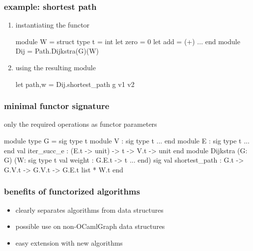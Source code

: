 \documentclass{beamer}
\newcommand{\ocamlgraph}{\textsf{OCamlGraph}}
\let\emph\alert
\begin{document}
\begin{frame}[fragile]
  \frametitle{example: shortest path}

  \begin{enumerate}
  \item \emph{instantiating} the functor
  \begin{ocaml}
    module W = struct
      type t = int
      let zero = 0
      let add = (+)
      ...
    end
    module Dij = Path.Dijkstra(G)(W)
  \end{ocaml}

  \item \emph{using} the resulting module
  \begin{ocaml}
    let path,w = Dij.shortest_path g v1 v2
  \end{ocaml}
  \end{enumerate}
\end{frame}

\begin{frame}[fragile]
  \frametitle{minimal functor signature}
only the \emph{required operations} as functor parameters
  \begin{ocaml}
module type G = sig
  type t
  module V : sig type t ... end
  module E : sig type t ... end
  val iter_succ_e : (E.t -> unit) -> t -> V.t -> unit
end
module Dijkstra
  (G: G)
  (W: sig type t val weight : G.E.t -> t ... end)
sig
  val shortest_path : G.t -> G.V.t -> G.V.t ->
                      G.E.t list * W.t
end
  \end{ocaml}
\end{frame}

\begin{frame}
  \frametitle{benefits of functorized algorithms}

  \begin{itemize}
  \item clearly \emph{separates} algorithms from data structures\vskip8pt
  \item possible use on \emph{non-\ocamlgraph} data structures\vskip8pt
  \item easy \emph{extension} with new algorithms\vskip8pt
  \end{itemize}

\end{frame}
\end{document}
